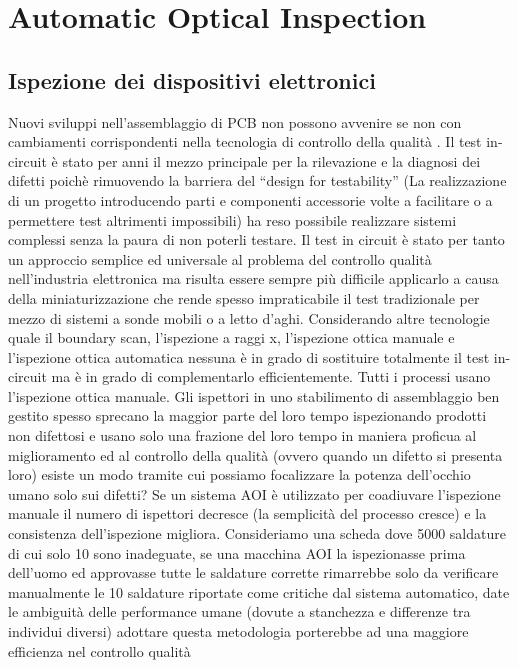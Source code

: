 \chapter{Automatic Optical Inspection}

\section{Ispezione dei dispositivi elettronici}
Nuovi sviluppi nell’assemblaggio di PCB non possono avvenire se non con cambiamenti corrispondenti
nella tecnologia di controllo della qualità \cite{4459975}.
Il test in-circuit è stato per anni il mezzo principale per la rilevazione e la diagnosi dei difetti poichè
rimuovendo la barriera del “design for testability” (La realizzazione di un progetto introducendo parti e
componenti accessorie volte a facilitare o a permettere test altrimenti impossibili) ha reso possibile
realizzare sistemi complessi senza la paura di non poterli testare. Il test in circuit è stato per tanto un
approccio semplice ed universale al problema del controllo qualità nell’industria elettronica ma risulta
essere sempre più difficile applicarlo a causa della miniaturizzazione che rende spesso impraticabile il test
tradizionale per mezzo di sistemi a sonde mobili o a letto d’aghi.
Considerando altre tecnologie quale il boundary scan, l’ispezione a raggi x, l’ispezione ottica manuale e
l’ispezione ottica automatica nessuna è in grado di sostituire totalmente il test in-circuit ma è in grado di
complementarlo efficientemente.
Tutti i processi usano l’ispezione ottica manuale. Gli ispettori in uno stabilimento di assemblaggio ben
gestito spesso sprecano la maggior parte del loro tempo ispezionando prodotti non difettosi e usano solo
una frazione del loro tempo in maniera proficua al miglioramento ed al controllo della qualità (ovvero
quando un difetto si presenta loro) esiste un modo tramite cui possiamo focalizzare la potenza dell’occhio
umano solo sui difetti?
Se un sistema AOI è utilizzato per coadiuvare l’ispezione manuale il numero di ispettori decresce (la
semplicità del processo cresce) e la consistenza dell’ispezione migliora. Consideriamo una scheda dove
5000 saldature di cui solo 10 sono inadeguate, se una macchina AOI la ispezionasse prima dell’uomo ed
approvasse tutte le saldature corrette rimarrebbe solo da verificare manualmente le 10 saldature riportate
come critiche dal sistema automatico, date le ambiguità delle performance umane (dovute a stanchezza e
differenze tra individui diversi) adottare questa metodologia porterebbe ad una maggiore efficienza nel controllo qualità

